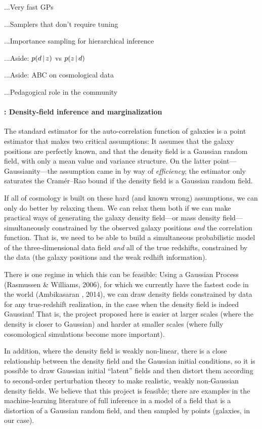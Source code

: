 \documentclass[12pt]{article}
\begin{document}
...Very fast GPs

...Samplers that don't require tuning

...Importance sampling for hierarchical inference

...Aside:  $p(d\,|\, z)$ vs $p(z\,|\, d)$

...Aside:  ABC on cosmological data

...Pedagogical role in the community

\paragraph{: Density-field inference and marginalization}

The standard estimator for the auto-correlation function of galaxies
is a point estimator that makes two critical assumptions:
It assumes that the galaxy positions are perfectly known, and that the
density field is a Gaussian random field, with only a mean value and
variance structure.
On the latter point---Gaussianity---the assumption came in by way of
\emph{efficiency}; the estimator only saturates the Cram\'er--Rao
bound if the density field is a Gaussian random field.

If all of cosmology is built on these hard (and known wrong)
assumptions, we can only do better by relaxing them.
We can relax them both if we can make practical ways of generating the
galaxy density field---or mass density field---simultaneously
constrained by the observed galaxy positions \emph{and} the
correlation function.
That is, we need to be able to build a simultaneous probabilistic
model of the three-dimensional data field \emph{and} all of the true
redshifts, constrained by the data (the galaxy positions and the weak
redhift information).

There is one regime in which this can be feasible:
Using a Gaussian Process (Rasmussen \& Williams, 2006), for which we currently have
the fastest code in the world (Ambikasaran \etal, 2014), we can draw density fields
constrained by data for any true-redshift realization, in the case
when the density field is indeed Gaussian!
That is, the project proposed here is easier at larger scales (where
the density is closer to Gaussian) and harder at smaller scales (where
fully cosomological simulations become more important).

In addition, where the density field is weakly non-linear, there is a close
relationship between the density field and the Gaussian initial
conditions, so it is possible to draw Gaussian initial ``latent''
fields and then distort them according to second-order perturbation
theory to make realistic, weakly non-Gaussian density fields.
We believe that this project is feasible; there are examples in
the machine-learning literature of full inference in a model of a
field that is a distortion of a Gaussian random field, and then
sampled by points (galaxies, in our case).
\end{document}
